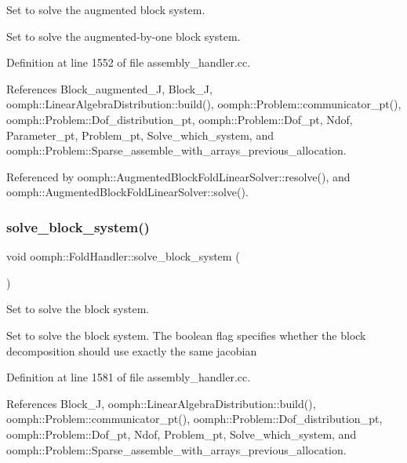 Set to solve the augmented block system. 

Set to solve the augmented-\/by-\/one block system. 

Definition at line 1552 of file assembly\+\_\+handler.\+cc.



References Block\+\_\+augmented\+\_\+J, Block\+\_\+J, oomph\+::\+Linear\+Algebra\+Distribution\+::build(), oomph\+::\+Problem\+::communicator\+\_\+pt(), oomph\+::\+Problem\+::\+Dof\+\_\+distribution\+\_\+pt, oomph\+::\+Problem\+::\+Dof\+\_\+pt, Ndof, Parameter\+\_\+pt, Problem\+\_\+pt, Solve\+\_\+which\+\_\+system, and oomph\+::\+Problem\+::\+Sparse\+\_\+assemble\+\_\+with\+\_\+arrays\+\_\+previous\+\_\+allocation.



Referenced by oomph\+::\+Augmented\+Block\+Fold\+Linear\+Solver\+::resolve(), and oomph\+::\+Augmented\+Block\+Fold\+Linear\+Solver\+::solve().

\mbox{\label{classoomph_1_1FoldHandler_abf0c7293014112731f0482e464f4daa3}} 
\subsubsection{\texorpdfstring{solve\+\_\+block\+\_\+system()}{solve\_block\_system()}}
{\footnotesize\ttfamily void oomph\+::\+Fold\+Handler\+::solve\+\_\+block\+\_\+system (\begin{DoxyParamCaption}{ }\end{DoxyParamCaption})}



Set to solve the block system. 

Set to solve the block system. The boolean flag specifies whether the block decomposition should use exactly the same jacobian 

Definition at line 1581 of file assembly\+\_\+handler.\+cc.



References Block\+\_\+J, oomph\+::\+Linear\+Algebra\+Distribution\+::build(), oomph\+::\+Problem\+::communicator\+\_\+pt(), oomph\+::\+Problem\+::\+Dof\+\_\+distribution\+\_\+pt, oomph\+::\+Problem\+::\+Dof\+\_\+pt, Ndof, Problem\+\_\+pt, Solve\+\_\+which\+\_\+system, and oomph\+::\+Problem\+::\+Sparse\+\_\+assemble\+\_\+with\+\_\+arrays\+\_\+previous\+\_\+allocation.

